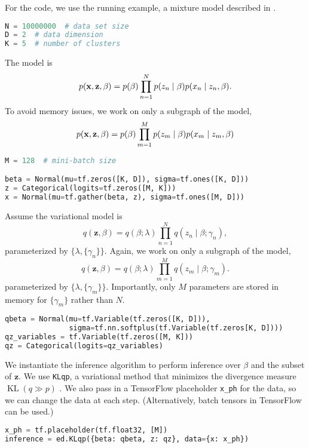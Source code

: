 For the code, we use the running example, a mixture model
described in .
\begin{lstlisting}[language=Python]
N = 10000000  # data set size
D = 2  # data dimension
K = 5  # number of clusters
\end{lstlisting}
The model is
\begin{equation*}
p(\boldsymbol{\mathbf{x}}, \mathbf{z}, \beta)
= p(\beta) \prod_{n=1}^N p(z_n \mid \beta) p(x_n \mid z_n, \beta).
\end{equation*}
To avoid memory issues, we work on only a subgraph of the model,
\begin{equation*}
p(\boldsymbol{\mathbf{x}}, \mathbf{z}, \beta)
= p(\beta) \prod_{m=1}^M p(z_m \mid \beta) p(x_m \mid z_m, \beta)
\end{equation*}
\begin{lstlisting}[language=Python]
M = 128  # mini-batch size

beta = Normal(mu=tf.zeros([K, D]), sigma=tf.ones([K, D]))
z = Categorical(logits=tf.zeros([M, K]))
x = Normal(mu=tf.gather(beta, z), sigma=tf.ones([M, D]))
\end{lstlisting}
Assume the variational model is
\begin{equation*}
q(\mathbf{z}, \beta) =
q(\beta; \lambda) \prod_{n=1}^N q(z_n \mid \beta; \gamma_n),
\end{equation*}
parameterized by $\{\lambda, \{\gamma_n\}\}$.
Again, we work on only a subgraph of the model,
\begin{equation*}
q(\mathbf{z}, \beta) =
q(\beta; \lambda) \prod_{m=1}^M q(z_m \mid \beta; \gamma_m).
\end{equation*}
parameterized by $\{\lambda, \{\gamma_m\}\}$. Importantly, only $M$
parameters are stored in memory for $\{\gamma_m\}$ rather than $N$.
\begin{lstlisting}[language=Python]
qbeta = Normal(mu=tf.Variable(tf.zeros([K, D])),
               sigma=tf.nn.softplus(tf.Variable(tf.zeros[K, D])))
qz_variables = tf.Variable(tf.zeros([M, K]))
qz = Categorical(logits=qz_variables)
\end{lstlisting}
We instantiate the inference algorithm to perform inference over
$\beta$ and the subset of $\mathbf{z}$.
We use \texttt{KLqp}, a variational method that minimizes
the divergence measure $\operatorname{KL}(q\gg p)$
\citep{jordan1999introduction}.
We also pass in a TensorFlow placeholder \texttt{x_ph} for the data,
so we can change the data at each step. (Alternatively,
batch tensors in TensorFlow can be used.)
\begin{lstlisting}[language=Python]
x_ph = tf.placeholder(tf.float32, [M])
inference = ed.KLqp({beta: qbeta, z: qz}, data={x: x_ph})
\end{lstlisting}
